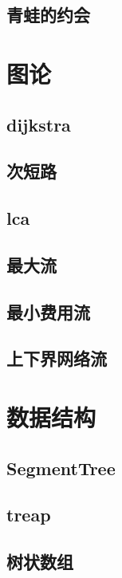 \documentclass[twocolumn,a4,twoside]{book}
\begin{document}
		\section{青蛙的约会}
		
	
	\chapter{图论}
		\section{dijkstra}
		
		\section{次短路}
		
		\section{lca}
		
		\section{最大流}
		
		\section{最小费用流}
		
		\section{上下界网络流}
		
	
	\chapter{数据结构}
		\section{SegmentTree}
		
		\section{treap}
		
		\section{树状数组}
		
\end{document}
